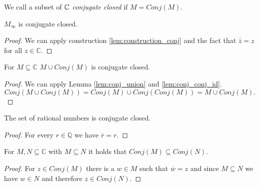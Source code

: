 \begin{definition}
    \label{def:conj_closed}
    \leanok
    We call a subset of $\mathbb{C}$ \emph{conjugate closed} if $M= Conj(M)$.
\end{definition}


\begin{lemma}
    \label{lem:conj_MField}
    \leanok

    $M_{\infty}$ is conjugate closed.
\end{lemma}
\begin{proof}
    \leanok
    We can apply construction \ref{lem:construction_conj} and the fact that $\overline{\overline z} = z$ for all $z \in\mathbb{C}$.
\end{proof}

\begin{lemma}
    \label{lem:M_con_M}
    \leanok
    For $M\subseteq \mathbb{C}$ $M\cup Conj(M)$ is conjugate closed.
\end{lemma}
\begin{proof}
    \leanok
    We can apply Lemma \ref{lem:conj_union} and \ref{lem:conj_conj_id}.
    $$Conj(M\cup Conj(M)) = Conj(M) \cup Conj(Conj(M)) = M \cup Conj(M).$$
\end{proof}

\begin{lemma}
    \label{lem:ConjClosed.Rat_ConjClosed}
    \leanok
    The set of rational numbers is conjugate closed.
\end{lemma}

\begin{proof}
    \leanok
    For every $r \in \mathbb{Q}$ we have $\overline{r} = r$.
\end{proof}

\begin{lemma}
    \label{lem:ConjClosed.conj_inclusion}
    \leanok
    For $M,N \subseteq \mathbb{C}$ with $M \subseteq N$ it holds that $Conj(M) \subseteq Conj(N)$.
\end{lemma}
\begin{proof}
    \leanok
    For $z \in Conj(M)$ there is a $w \in M$ such that $\overline{w} = z$ and since $M \subseteq N$ we have $w \in N$ and therefore $z \in Conj(N)$.
\end{proof}

